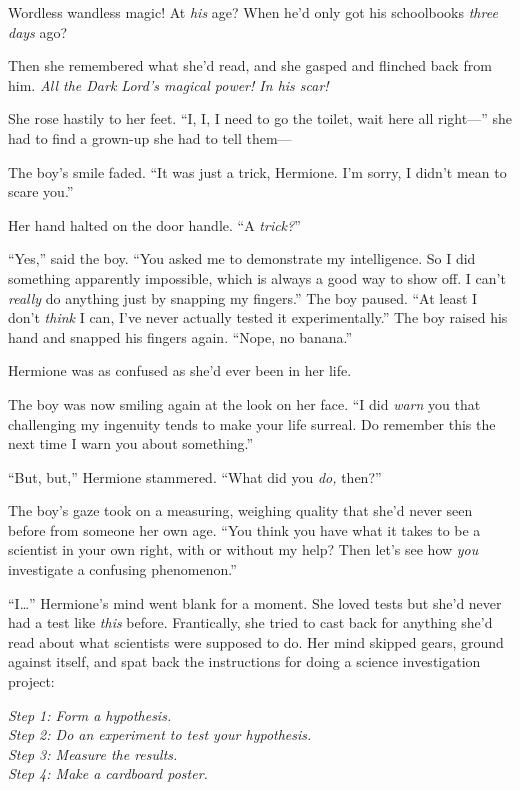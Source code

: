 Wordless wandless magic! At \emph{his} age? When he’d only got his schoolbooks \emph{three days} ago?

Then she remembered what she’d read, and she gasped and flinched back from him. \emph{All the Dark Lord’s magical power! In his scar!}

She rose hastily to her feet. “I, I, I need to go the toilet, wait here all right—” she had to find a grown-up she had to tell them—

The boy’s smile faded. “It was just a trick, Hermione. I’m sorry, I didn’t mean to scare you.”

Her hand halted on the door handle. “A \emph{trick?}”

“Yes,” said the boy. “You asked me to demonstrate my intelligence. So I did something apparently impossible, which is always a good way to show off. I can’t \emph{really} do anything just by snapping my fingers.” The boy paused. “At least I don’t \emph{think} I can, I’ve never actually tested it experimentally.” The boy raised his hand and snapped his fingers again. “Nope, no banana.”

Hermione was as confused as she’d ever been in her life.

The boy was now smiling again at the look on her face. “I did \emph{warn} you that challenging my ingenuity tends to make your life surreal. Do remember this the next time I warn you about something.”

“But, but,” Hermione stammered. “What did you \emph{do,} then?”

The boy’s gaze took on a measuring, weighing quality that she’d never seen before from someone her own age. “You think you have what it takes to be a scientist in your own right, with or without my help? Then let’s see how \emph{you} investigate a confusing phenomenon.”

“I…” Hermione’s mind went blank for a moment. She loved tests but she’d never had a test like \emph{this} before. Frantically, she tried to cast back for anything she’d read about what scientists were supposed to do. Her mind skipped gears, ground against itself, and spat back the instructions for doing a science investigation project:

\emph{Step 1: Form a hypothesis.\\
Step 2: Do an experiment to test your hypothesis.\\
Step 3: Measure the results.\\
Step 4: Make a cardboard poster.}

